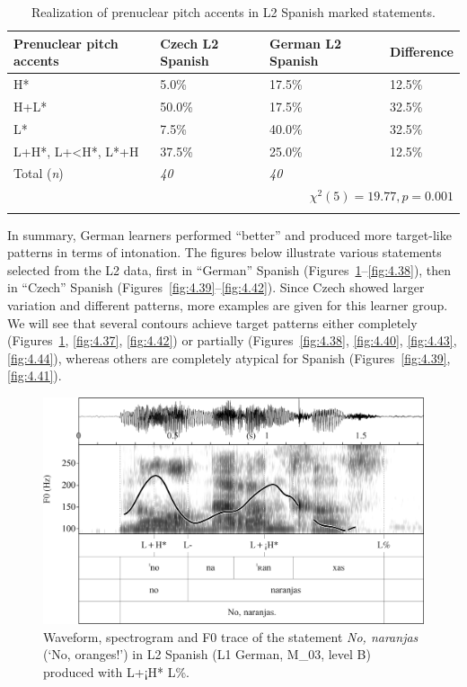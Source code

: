 \begin{table}
\begin{tabularx}{\textwidth}{lYYY}

\lsptoprule

{Prenuclear pitch accents} & {Czech L2 Spanish} & {German L2 Spanish} & {Difference}\\
\midrule
H* &  5.0\% &  17.5\% &  12.5\%\\
H+L* &  50.0\% &  17.5\% &  32.5\%\\
L* &  7.5\% &  40.0\% &  32.5\%\\
L+H*, L+<H*, L*+H &  37.5\% &  25.0\% &  12.5\%\\
\midrule
Total (\textit{n}) & {\itshape 40} & {\itshape 40} &  \\
\\
\lspbottomrule
\end{tabularx}

\caption{Realization of prenuclear pitch accents in L2 Spanish marked statements.}
\label{tab:4.13}
\end{table}

In summary, German learners performed “better” and produced more target-like patterns in terms of intonation. The figures below illustrate various statements selected from the L2 data, first in “German” Spanish (Figures~\ref{fig:4.36}--\ref{fig:4.38}), then in “Czech” Spanish (Figures~\ref{fig:4.39}--\ref{fig:4.42}). Since Czech showed larger variation and different patterns, more examples are given for this learner group. We will see that several contours achieve target patterns either completely (Figures~\ref{fig:4.36}, \ref{fig:4.37}, \ref{fig:4.42}) or partially (Figures~\ref{fig:4.38}, \ref{fig:4.40}, \ref{fig:4.43}, \ref{fig:4.44}), whereas others are completely atypical for Spanish (Figures~\ref{fig:4.39}, \ref{fig:4.41}).

\begin{figure}


\includegraphics[width=\textwidth]{figures/Figure_4.36.png}


\caption{Waveform, spectrogram and F0 trace of the statement \textit{No, naranjas} (‘No, oranges!’) in L2 Spanish (L1 German, M\_03, level B) produced with L+¡H* L\%.}
\label{fig:4.36}
\end{figure}


